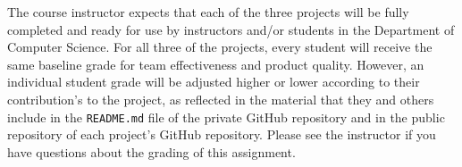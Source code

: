 \documentclass[11pt]{article}
\newcommand{\reflection}{\lstinline{README.md}}
\begin{document}
The course instructor expects that each of the three projects will be fully completed and ready for use by instructors
and/or students in the Department of Computer Science. For all three of the projects, every student will receive the
same baseline grade for team effectiveness and product quality. However, an individual student grade will be adjusted
higher or lower according to their contribution's to the project, as reflected in the material that they and others
include in the \reflection{} file of the private GitHub repository and in the public repository of each project's GitHub
repository. Please see the instructor if you have questions about the grading of this assignment.
\end{document}
